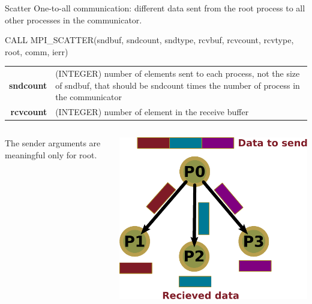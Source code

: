 \documentclass[aspectratio=43]{beamer}
\begin{document}
\begin{frame}[fragile]{Scatter}
One-to-all communication: different data sent from the root process to all other processes in the communicator.\\
\begin{Fortranlisting}[]{}
CALL MPI_SCATTER(sndbuf, sndcount, sndtype,
                 rcvbuf, rcvcount, rcvtype,
                 root, comm, ierr)
\end{Fortranlisting}
\begin{black1block}{}
\begin{tabular}{rp{8cm}}
\textbf{sndcount} & (INTEGER) number of elements sent to each process, not the size of sndbuf, that should be sndcount times the number of process in the communicator\\
\textbf{rcvcount} & (INTEGER) number of element in the receive buffer\\
\end{tabular}
\end{black1block}
\begin{columns}
    \begin{column}{0.7\paperwidth}
        \hspace{1cm}The sender arguments are meaningful only for root.
    \end{column}
    \begin{column}{0.3\paperwidth}
    \includegraphics[scale=0.3]{03.MPI_Coll/scatter.pdf}\\
    \end{column}
\end{columns}
\end{frame}
\end{document}
